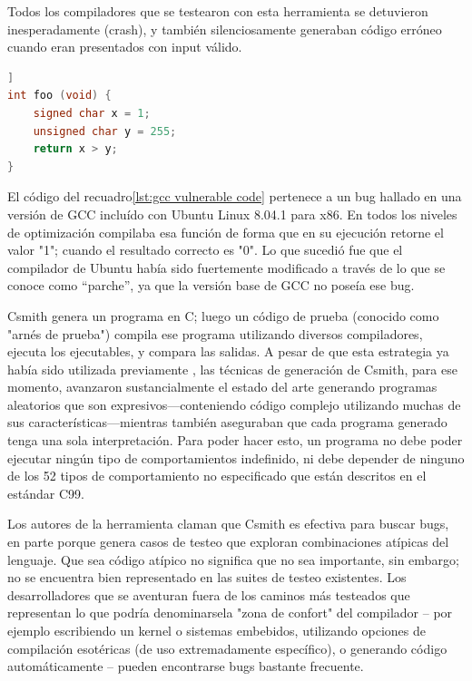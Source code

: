 Todos los compiladores que se testearon con esta herramienta se detuvieron inesperadamente (crash), y también silenciosamente generaban código erróneo cuando eran presentados con input válido.

\begin{lstlisting}[language={c}, label={lst:gcc vulnerable code}, caption={Código que produjo bug en GCC}, captionpos={b}, frame={shadowbox}]]
int foo (void) {
    signed char x = 1;
    unsigned char y = 255;
    return x > y;
}
\end{lstlisting}

El código del recuadro\ref{lst:gcc vulnerable code} pertenece a un bug hallado en una versión de GCC incluído con Ubuntu Linux 8.04.1 para x86. En todos los niveles de optimización compilaba esa función  de forma que en su ejecución retorne el valor "1"; cuando el resultado correcto es "0". Lo que sucedió fue que el compilador de Ubuntu había sido fuertemente modificado a través de lo que se conoce como “parche”, ya que la versión base de GCC no poseía ese bug\cite{Yang:2011:FUB:1993316.1993532}.

Csmith genera un programa en C; luego un código de prueba (conocido como "arnés de prueba") compila ese programa utilizando diversos compiladores, ejecuta los ejecutables, y compara las salidas. A pesar de que esta estrategia ya había sido utilizada previamente \cite{Eide:2008:VM:1450058.1450093}\cite{McKeeman98differentialtesting}\cite{Sheridan2007c99comparison}, las técnicas de generación de Csmith, para ese momento, avanzaron sustancialmente el estado del arte generando programas aleatorios que son expresivos—conteniendo código complejo utilizando muchas de sus características—mientras también aseguraban que cada programa generado tenga una sola interpretación. Para poder hacer esto, un programa no debe poder ejecutar ningún tipo de comportamientos indefinido, ni debe depender de ninguno de los 52 tipos de comportamiento no especificado que están descritos en el estándar C99\cite{openstdc99}.

Los autores de la herramienta claman que Csmith es efectiva para buscar bugs, en parte porque genera casos de testeo que exploran combinaciones atípicas del lenguaje. Que sea código atípico no significa que no sea importante, sin embargo; no se encuentra bien representado en las suites de testeo existentes. Los desarrolladores que se aventuran fuera de los caminos más testeados que representan lo que podría denominarsela "zona de confort" del compilador -- por ejemplo escribiendo un kernel o sistemas embebidos, utilizando opciones de compilación esotéricas (de uso extremadamente específico), o generando código automáticamente -- pueden encontrarse bugs bastante frecuente.

